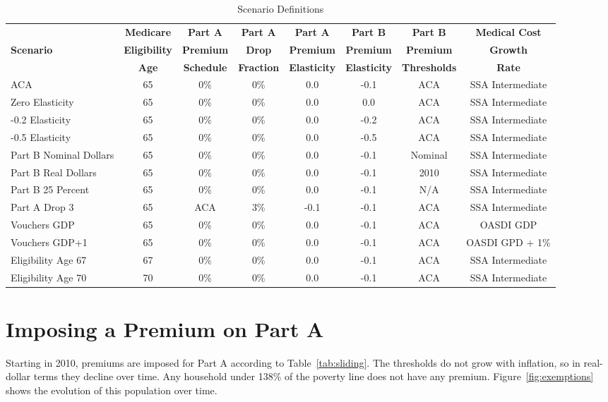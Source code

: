 \documentclass{article}
\begin{document}
\begin{table}[ht]
\centering
\caption{Scenario Definitions}\vspace{0.2in}
\begin{tabular}{|l|c|c|c|c|c|c|c|}\hline
 & \textbf{Medicare} & \textbf{Part A} & \textbf{Part A} & \textbf{Part A} & \textbf{Part B} & \textbf{Part B} & \textbf{Medical Cost} \\
\textbf{Scenario} & \textbf{Eligibility} & \textbf{Premium} & \textbf{Drop} & \textbf{Premium} & \textbf{Premium} & \textbf{Premium} & \textbf{Growth} \\
& \textbf{Age} & \textbf{Schedule} & \textbf{Fraction} & \textbf{Elasticity} & \textbf{Elasticity} & \textbf{Thresholds} & \textbf{Rate}\\\hline
ACA & 65 & 0\% & 0\% & 0.0 & -0.1 & ACA & SSA Intermediate\\\hline
Zero Elasticity & 65 & 0\% & 0\% & 0.0 & 0.0 & ACA & SSA Intermediate\\\hline
-0.2 Elasticity & 65 & 0\% & 0\% & 0.0 & -0.2 & ACA & SSA Intermediate\\\hline
-0.5 Elasticity & 65 & 0\% & 0\% & 0.0 & -0.5 & ACA & SSA Intermediate\\\hline
Part B Nominal Dollars & 65 & 0\% & 0\% & 0.0 & -0.1 & Nominal & SSA Intermediate\\\hline
Part B Real Dollars & 65 & 0\% & 0\% & 0.0 & -0.1 & 2010 & SSA Intermediate\\\hline
Part B 25 Percent & 65 & 0\% & 0\% & 0.0 & -0.1 & N/A & SSA Intermediate\\\hline
Part A Drop 3 & 65 & ACA & 3\% & -0.1 & -0.1 & ACA & SSA Intermediate\\\hline
Vouchers GDP & 65 & 0\% & 0\% & 0.0 & -0.1 & ACA & OASDI GDP \\\hline
Vouchers GDP+1 & 65 & 0\% & 0\% & 0.0 & -0.1 & ACA & OASDI GPD + 1\%\\\hline
Eligibility Age 67 & 67 & 0\% & 0\% & 0.0 & -0.1 & ACA & SSA Intermediate\\\hline
Eligibility Age 70 & 70 & 0\% & 0\% & 0.0 & -0.1 & ACA & SSA Intermediate\\\hline
\end{tabular}
\label{tab:scenarios}
\end{table}

\section{Imposing a Premium on Part A}
Starting in 2010, premiums are imposed for Part A according to Table~\ref{tab:sliding}. The thresholds do not grow with inflation, so in real-dollar terms they decline over time. Any household under 138\% of the poverty line does not have any premium. Figure~\ref{fig:exemptions} shows the evolution of this population over time.
\end{document}
